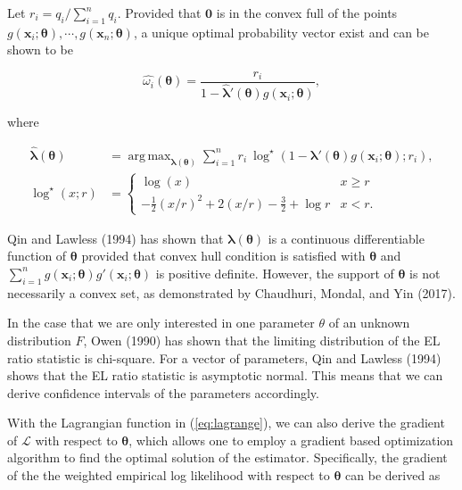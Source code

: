 \documentclass[article]{jss}
\renewcommand{\|}{\,|\,}
\begin{document}
Let \(r_i = q_i/\sum_{i=1}^n q_i\). Provided that \(\bm 0\) is in the convex full of the points \(g(\bm x_i;\bm \theta),\cdots,g(\bm x_n;\bm \theta)\), a unique optimal probability vector exist and can be shown to be

\begin{equation}\label{eq:omegahat}
  \hat{\omega_i}(\bm \theta) = \frac{r_i}{1 - \hat{\bm \lambda}'(\bm \theta) g(\bm x_i;\bm \theta)},
\end{equation}

where

\begin{equation}
\begin{aligned}
\hat{\bm \lambda}(\bm \theta) &= \mathop{\mathrm{arg\,max}}_{\bm \lambda(\bm \theta)} \sum_{i=1}^n r_i\ {\log}^{\star}\left(1 - \bm \lambda'(\bm \theta) g(\bm x_i;\bm \theta); r_i\right), \\
{\log}^{\star}(x; r) &=
\begin{cases}
\log(x) & x \ge r \\
- \frac{1}{2} (x/r)^2 + 2 (x/r) - \frac{3}{2} + \log r & x < r.
\end{cases}
\end{aligned}
\label{eq:optim}
\end{equation}

Qin and Lawless (1994) has shown that \(\bm \lambda(\bm \theta)\) is a continuous differentiable function of \(\bm \theta\) provided that convex hull condition is satisfied with \(\bm \theta\) and \(\sum_{i=1}^n g(\bm x_i;\bm \theta)g'(\bm x_i;\bm \theta)\) is positive definite. However, the support of \(\bm \theta\) is not necessarily a convex set, as demonstrated by Chaudhuri, Mondal, and Yin (2017).

In the case that we are only interested in one parameter \(\theta\) of an unknown distribution \(F\), Owen (1990) has shown that the limiting distribution of the EL ratio statistic is chi-square. For a vector of parameters, Qin and Lawless (1994) shows that the EL ratio statistic is asymptotic normal. This means that we can derive confidence intervals of the parameters accordingly.

With the Lagrangian function in (\ref{eq:lagrange}), we can also derive the gradient of \(\mathcal{L}\) with respect to \(\bm \theta\), which allows one to employ a gradient based optimization algorithm to find the optimal solution of the estimator. Specifically, the gradient of the the weighted empirical log likelihood with respect to \(\bm \theta\) can be derived as
\end{document}
